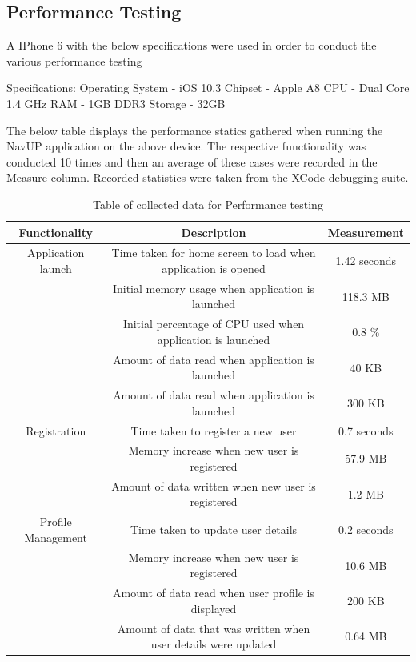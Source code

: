\documentclass[english]{article}
\begin{document}
\subsection{Performance Testing}\label{subsec:overall-performance}
		A IPhone 6 with the below specifications were used in order to conduct the various performance testing \newline
		
		Specifications: Operating System - iOS 10.3 \newline
		  Chipset - Apple A8 \newline 
		 CPU - Dual Core 1.4 GHz \newline
		 RAM - 1GB DDR3  \newline
		 Storage - 32GB \newline
		 
		 The below table displays the performance statics gathered when running the NavUP application on the above device. The respective functionality was conducted 10 times and then an average of these cases were recorded in the Measure column. Recorded statistics were taken from the XCode debugging suite.
		 
		 \begin{table}[h!]
		 	\centering
		 	\caption{Table of collected data for Performance testing}
		 	\label{tab: Table 2}
		 	\begin{tabular}{c c c}
		 		\hline
		 		\textbf{Functionality} & \textbf{Description} & \textbf{Measurement}\\
		 		\hline
		 		\hline
		 		Application launch &	Time taken for home screen to load when application is opened & 1.42 seconds \\ 
		 		 & Initial memory usage when application is launched  & 118.3 MB  \\ 
		 	    &	Initial percentage of CPU used when application is launched &	0.8 \% \\
		 		 & Amount of data read when application is launched  &	40 KB \\
		 		 & Amount of data read when application is launched  &	300 KB \\
		 		 Registration  & 	Time taken to register a new user & 	0.7 seconds \\
		 		 &  Memory increase when new user is registered	 & 57.9 MB \\
		 		  & Amount of data written when new user is registered & 	1.2 MB \\
		 		 Profile Management & 	Time taken to update user details & 	0.2 seconds \\
		 		  & Memory increase when new user is registered	 & 10.6 MB \\
		 		  & Amount of data read when user profile is displayed & 	200 KB \\
		 		 &  Amount of data that was written when user details were updated & 	0.64 MB \\ 
		 		 
		 		
		 		
		 		
		 		\hline
		 		
		 		
		 	\end{tabular}
		 \end{table}
		
\end{document}
